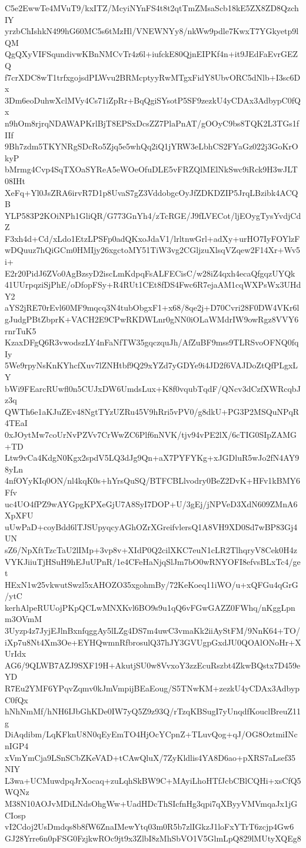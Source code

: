 C5e2EwwTe4MVuT9/kxITZ/McyiNYnFS4t8t2qtTmZMsaScb18kE5ZX8ZD8QzchIY
yrzbChIshkN499hG60MC5s6tMzHl/VNEWNYy8/nkWw9pdle7KwxT7YGkyetp9lQM
QgQXyVIFSqundivwKBnNMCvTr4z6l+iufckE80QjnEIPKf4n+it9JEdFaEvrGEZQ
f7crXDC8wT1trfxgojsdPLWvu2BRMcptyyRwMTgxFidY8UbvORC5dNlb+I3sc6Dx
3Dm6eoDuhwXclMVy4Cs71iZpRr+BqQgiSYsotP5SF9zezkU4yCDAx3AdbypC0fQx
n9hOm8rjrqNDAWAPKrlBjT8EPSxDcsZZ7PlaPnAT/gOOyC9bs8TQK2L3TGs1fIIf
9Bh7zdm5TKYNRgSDcRo5Zjq5e5whQq2iQ1jYRW3eLbhCS2FYaGz022j3GoKrOkyP
bMrmg4Cvp4SqTXOaSYReA5eWOeOfuDLE5vFRZQlMElNkSwc9iRck9H3wJLT08IHt
XeFq+Yl0JsZRA6irvR7D1p8UvaS7gZ3VddobgcOyJfZDKDZIP5JrqLBzibk4ACQB
YLP583P2KOiNPh1GliQR/G773GnYh4/zTcRGE/J9fLVECot/ljEOygTysYvdjCdZ
F3xh4d+Cd/xLdo1EtzLPSFp0adQKxoJdaV1/lrltnwGrl+adXy+urHO7IyFOYlzF
wDQuuz7hQiGCm0HMIjy26xgctoMY51TiW3vg2CGljzuXlsqVZqew2F14Xr+Wv5i+
E2r20PidJ6ZVo0AgBzsyD2iscLmKdpqFsALFECisC/w28iZ4qxh4ecaQfgqzUYQk
41UUrpqziSjPhE/oDfopFSy+R4RUt1CEt8fDS4Fwc6R7ejaAM1cqWXPsWx3UHdY2
aYS2jRE70rEvl60MF9mqcq3N4tubObgxF1+x68/8qe2j+D70Cvri28F0DW4VKr6l
gJudgPBtZbprK+VACH2E9CPwRKDWLnr0gNN0iOLaWMdrIW9owRgz8VVY6rnrTuK5
KzaxDFgQ6R3vwodszLY4nFaNfTW35gqczquJh/AfZuBF9mss9TLRSvoOFNQ0fqIy
5We9rpyNsKnKYhcfXuv7lZNHtbf9Q29xYZd7yGDYe9i4JD2f6VAJDoZtQfPLgxLY
bWi9FEarcRUwfl0n5CUJxDW6UmdsLux+K8f0vqubTqdF/QNcv3dCzfXWRcqbJz3q
QWTh6e1aKJuZEv48NgtTYzUZRu45V9hRri5vPV0/g8dkU+PG3P2MSQuNPqR4TEaI
0xJOytMw7coUrNvPZVv7CrWwZC6Plf6nNVK/tjv94vPE2lX/6cTIG0SIpZAMG+TD
Ltw9vCa4KdgN0Kgx2spdV5LQ3dJg9Qn+aX7PYFYKg+xJGDluR5wJo2fN4AY98yLn
4nfOYyKIq0ON/nl4kqK0s+hYrsQuSQ/BTFCBLlvodry0BeZ2DvK+HFv1kBMY6Ffv
uc4UO4fPZ9wAYGpgKPXeGjU7A8SyI7DOP+U/3gEj/jNPVeD3XdN609ZMnA6XpXFU
uUwPaD+coyBdd6lTJSUpyqcyAGhOZrXGreifvlersQ1A8VH9XD0Sd7wBP83Gj4UN
sZ6/NpXftTzcTaU2lIMp+3vp8v+XIdP0Q2cilXKC7euN1cLR2TlhqryV8Cek0H4z
VYKJiiuTjHSuH9hEJuUPnR/1e4CFeHaNjqSlJm7bO0wRNYOFI8efvsBLxTc4/get
HExN1w25vkwutSwzl5xAHOZO35xgohmBy/72KeKoeq11iWO/u+xQFGu4qGrG/ytC
kerhAlpeRUUojPKpQCLwMNXKvl6BO9s9u1qQ6vFGwGAZZ0FWhq/nKggLpnm3OVmM
3Uyzp4z7JyjEJlnBxnfqggAy5lLZg4DS7m4uwC3vmaKk2iiAyStFM/9NnK64+TO/
iXp7u8Nt4Xm3Oe+EYHQwmnRfbrosulQ37hJY3GVUgpGxdJU0QOAlONoHr+XUrIdx
AG6/9QLWB7AZJ9SXF19H+AkutjSU0w8VvxoY3zzEcuRszbt4ZkwBQstx7D459eYD
R7Eu2YMF6YPqvZqmv0kJmVmpijBEaEoug/S5TNwKM+zezkU4yCDAx3AdbypC0fQx
hNhNmMf/hNH6IJbGhKDe0IW7yQ5Z9z93Q/rTzqKBSugI7yUnqdfKouclBreuZ11g
DiAqdibm/LqKFknU8N0qEyEmTO4HjOcYCpnZ+TLuvQog+qJ/OG8OztmiINcnIGP4
xVmYmCja9LSnSCbZKeVAD+tCAwQluX/7ZyKldlis4YA8D6ao+pXRS7aLsef35NIY
L3wa+UCMuwdpqJrXocaq+zuLqhSkBW9C+MAyiLhoHTfJcbCBlCQHi+xsCfQ5WQNz
M38N10AOJvMDiLNdsOhgWw+UadHDcThSIcfnHg3qpi7qXByyVMVmqaJx1jGCIosp
vI2Cdoj2UsDmdqs8b8fW6ZnaIMewYtq03m0R5b7zlIGkzJ1loFxYTrT6zcjp4Gw6
GJ28Yrre6n0pFSG0FzjkwROc9jt9x3ZlbI8zMhSbVO1V5GlmLpQ829lMUtyXQEg8
